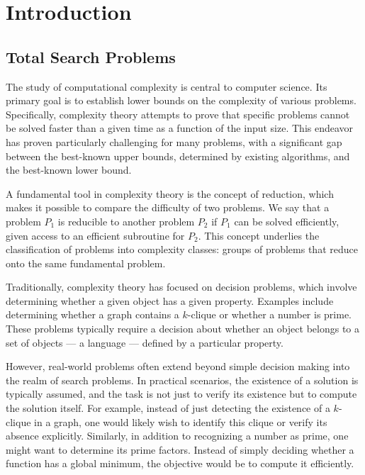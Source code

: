 \setchapterpreamble[u]{\margintoc}
\chapter{Introduction}\label{ch:introduction}

\section{Total Search Problems}\label{sec:intro_total_search_problems}

The study of computational complexity is central to computer science. Its primary goal is to establish lower bounds on the complexity of various problems. Specifically, complexity theory attempts to prove that specific problems cannot be solved faster than a given time as a function of the input size. This endeavor has proven particularly challenging for many problems, with a significant gap between the best-known upper bounds, determined by existing algorithms, and the best-known lower bound.

A fundamental tool in complexity theory is the concept of reduction, which makes it possible to compare the difficulty of two problems. We say that a problem $P_1$ is reducible to another problem $P_2$ if $P_1$ can be solved efficiently, given access to an efficient subroutine for $P_2$. This concept underlies the classification of problems into complexity classes: groups of problems that reduce onto the same fundamental problem.

Traditionally, complexity theory has focused on decision problems, which involve determining whether a given object has a given property. Examples include determining whether a graph contains a $k$-clique or whether a number is prime. These problems typically require a decision about whether an object belongs to a set of objects --- a language --- defined by a particular property.

However, real-world problems often extend beyond simple decision making into the realm of search problems. In practical scenarios, the existence of a solution is typically assumed, and the task is not just to verify its existence but to compute the solution itself. For example, instead of just detecting the existence of a $k$-clique in a graph, one would likely wish to identify this clique or verify its absence explicitly. Similarly, in addition to recognizing a number as prime, one might want to determine its prime factors. Instead of simply deciding whether a function has a global minimum, the objective would be to compute it efficiently.

